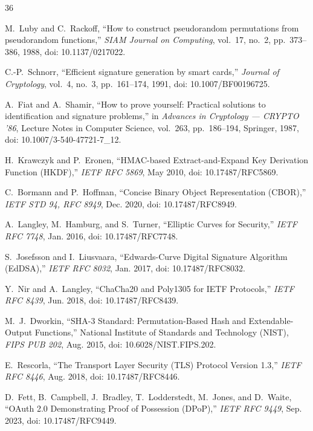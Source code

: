 \documentclass[conference,10pt]{IEEEtran}
\begin{document}
\FloatBarrier
\begin{thebibliography}{36}

M.~Luby and C.~Rackoff, ``How to construct pseudorandom permutations from pseudorandom functions,'' \emph{SIAM Journal on Computing}, vol.~17, no.~2, pp.~373--386, 1988, doi: 10.1137/0217022.

C.-P.~Schnorr, ``Efficient signature generation by smart cards,'' \emph{Journal of Cryptology}, vol.~4, no.~3, pp.~161--174, 1991, doi: 10.1007/BF00196725.

A.~Fiat and A.~Shamir, ``How to prove yourself: Practical solutions to identification and signature problems,'' in \emph{Advances in Cryptology --- CRYPTO '86}, Lecture Notes in Computer Science, vol.~263, pp.~186--194, Springer, 1987, doi: 10.1007/3-540-47721-7\_12.

H.~Krawczyk and P.~Eronen, ``HMAC-based Extract-and-Expand Key Derivation Function (HKDF),'' \emph{IETF RFC 5869}, May 2010, doi: 10.17487/RFC5869.

C.~Bormann and P.~Hoffman, ``Concise Binary Object Representation (CBOR),'' \emph{IETF STD 94, RFC 8949}, Dec. 2020, doi: 10.17487/RFC8949.

A.~Langley, M.~Hamburg, and S.~Turner, ``Elliptic Curves for Security,'' \emph{IETF RFC 7748}, Jan. 2016, doi: 10.17487/RFC7748.

S.~Josefsson and I.~Liusvaara, ``Edwards-Curve Digital Signature Algorithm (EdDSA),'' \emph{IETF RFC 8032}, Jan. 2017, doi: 10.17487/RFC8032.

Y.~Nir and A.~Langley, ``ChaCha20 and Poly1305 for IETF Protocols,'' \emph{IETF RFC 8439}, Jun. 2018, doi: 10.17487/RFC8439.

M.~J.~Dworkin, ``SHA-3 Standard: Permutation-Based Hash and Extendable-Output Functions,'' National Institute of Standards and Technology (NIST), \emph{FIPS PUB 202}, Aug. 2015, doi: 10.6028/NIST.FIPS.202.

E.~Rescorla, ``The Transport Layer Security (TLS) Protocol Version 1.3,'' \emph{IETF RFC 8446}, Aug. 2018, doi: 10.17487/RFC8446.

D.~Fett, B.~Campbell, J.~Bradley, T.~Lodderstedt, M.~Jones, and D.~Waite, ``OAuth 2.0 Demonstrating Proof of Possession (DPoP),'' \emph{IETF RFC 9449}, Sep. 2023, doi: 10.17487/RFC9449.


\end{thebibliography}
\end{document}
